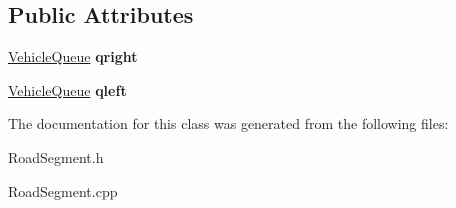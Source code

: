 \subsection*{Public Attributes}
\begin{DoxyCompactItemize}
\item 
\hypertarget{class_road_segment_a33e663e38e3d1944398ff70198fdb77b}{\hyperlink{class_vehicle_queue}{Vehicle\-Queue} {\bfseries qright}}\label{class_road_segment_a33e663e38e3d1944398ff70198fdb77b}

\item 
\hypertarget{class_road_segment_a0272daa14fc04bc471f81409db27b80b}{\hyperlink{class_vehicle_queue}{Vehicle\-Queue} {\bfseries qleft}}\label{class_road_segment_a0272daa14fc04bc471f81409db27b80b}

\end{DoxyCompactItemize}


The documentation for this class was generated from the following files\-:\begin{DoxyCompactItemize}
\item 
Road\-Segment.\-h\item 
Road\-Segment.\-cpp\end{DoxyCompactItemize}
